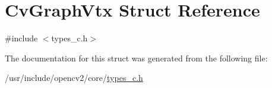 \hypertarget{structCvGraphVtx}{\section{Cv\-Graph\-Vtx Struct Reference}
\label{structCvGraphVtx}
}


{\ttfamily \#include $<$types\-\_\-c.\-h$>$}



The documentation for this struct was generated from the following file\-:\begin{DoxyCompactItemize}
\item 
/usr/include/opencv2/core/\hyperlink{core_2types__c_8h}{types\-\_\-c.\-h}\end{DoxyCompactItemize}
